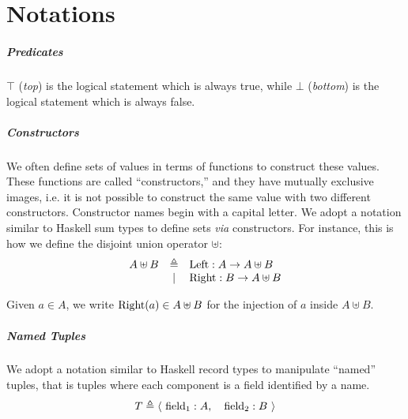 \chapter{Notations}
\label{frontmatter:notations}

\paragraph{Predicates}
%
\( \top \) (\emph{top}) is the logical statement which is always true, while \(
\bot \) (\emph{bottom}) is the logical statement which is always false.

\paragraph{Constructors}
%
We often define sets of values in terms of functions to construct these values.
%
These functions are called ``constructors,'' and they have mutually exclusive
images, i.e. it is not possible to construct the same value with two different
constructors.
%
Constructor names begin with a capital letter.
%
We adopt a notation similar to Haskell sum types to define sets \emph{via}
constructors.
%
For instance, this is how we define the disjoint union operator $\uplus$:
%
\[
  \begin{array}{rcl}
    A \uplus B & \triangleq & \mathrm{Left} : A \rightarrow A \uplus B \\
               & |          & \mathrm{Right} : B \rightarrow A \uplus B
  \end{array}
\]

Given $a \in A$, we write $\mathrm{Right}(a) \in A \uplus B$ for the injection of
$a$ inside $A \uplus B$.

\paragraph{Named Tuples}
%
We adopt a notation similar to Haskell record types to manipulate ``named''
tuples, that is tuples where each component is a field identified by a name.
%
\[
  T \triangleq \langle~\mathrm{field_1} : A,\quad\mathrm{field_2} : B~\rangle
\]

